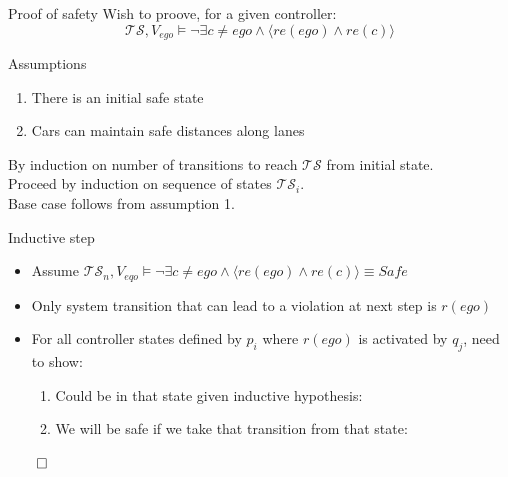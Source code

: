 \documentclass[xcolor=table]{beamer}
\begin{document}
\begin{frame}{Proof of safety}
Wish to proove, for a given controller:
\begin{equation*}\label{eq:safety_goal}
\mathcal{TS}, V_{ego} \models \neg \exists c \neq ego \land \langle re(ego) \land re(c)\rangle
\end{equation*}
\pause 
\begin{block}{Assumptions}
	\begin{enumerate}
		\item There is an initial safe state
		\item Cars can maintain safe distances along lanes
	\end{enumerate}
\end{block}

\pause
\bigskip
By induction on number of transitions to reach $\mathcal{TS}$ from initial state.\\
\bigskip
\pause
Proceed by induction on sequence of states $\mathcal{TS}_i$.\\
\bigskip
\pause
Base case follows from assumption 1.

\end{frame}

\begin{frame}{Inductive step}

	\begin{itemize}
		\item 	Assume $\mathcal{TS}_n, V_{eqo} \models \neg \exists c \neq ego \land \langle re(ego) \land re(c)\rangle \equiv Safe$\\
		\pause
		\item Only system transition that can lead to a violation at next step is $r(ego)$\\
		\pause
		\item For all controller states defined by $p_i$ where $r(ego)$ is activated by $q_j$, need to show:
		\begin{enumerate}
			\pause
			\item Could be in that state given inductive hypothesis:
			
			\begin{prooftree}\end{prooftree}
			\pause
			\item We will be safe if we take that transition from that state:
			\begin{prooftree}\end{prooftree}
		\end{enumerate}
	\end{itemize}
\pause
$\qed$

\end{frame}
\end{document}
